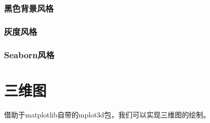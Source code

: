 \documentclass[letterpaper,10pt,english]{sphinxhowto}
\begin{document}


\subsubsection{黑色背景风格}
\label{\detokenize{_u914d_u7f6e_u6587_u4ef6_u548c_u6837_u5f0f_u8868:id6}}
%
\begin{sphinxVerbatim}[commandchars=\\\{\}]
 
\end{sphinxVerbatim}



\subsubsection{灰度风格}
\label{\detokenize{_u914d_u7f6e_u6587_u4ef6_u548c_u6837_u5f0f_u8868:id7}}
%
\begin{sphinxVerbatim}[commandchars=\\\{\}]
 
\end{sphinxVerbatim}



\subsubsection{Seaborn风格}
\label{\detokenize{_u914d_u7f6e_u6587_u4ef6_u548c_u6837_u5f0f_u8868:seaborn}}
%
\begin{sphinxVerbatim}[commandchars=\\\{\}]
 
\end{sphinxVerbatim}



\section{三维图}
\label{\detokenize{_u4e09_u7ef4_u56fe:id1}}\label{\detokenize{_u4e09_u7ef4_u56fe::doc}}
借助于matplotlib自带的mplot3d包，我们可以实现三维图的绘制。
\end{document}
